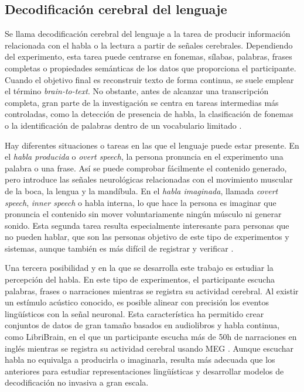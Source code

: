 \subsection{Decodificación cerebral del lenguaje}

Se llama decodificación cerebral del lenguaje a la tarea de producir información relacionada con el habla o la lectura a partir de señales cerebrales. Dependiendo del experimento, esta tarea puede centrarse en fonemas, sílabas, palabras, frases completas o propiedades semánticas de los datos que proporciona el participante. Cuando el objetivo final es reconstruir texto de forma continua, se suele emplear el término \textit{brain-to-text}. No obstante, antes de alcanzar una transcripción completa, gran parte de la investigación se centra en tareas intermedias más controladas, como la detección de presencia de habla, la clasificación de fonemas o la identificación de palabras dentro de un vocabulario limitado \cite{ozdogan2025libribrain,jayalath2025unlocking}.

Hay diferentes situaciones o tareas en las que el lenguaje puede estar presente. En el \textit{habla producida} o \textit{overt speech}, la persona pronuncia en el experimento una palabra o una frase. Así se puede comprobar fácilmente el contenido generado, pero introduce las señales neurológicas relacionadas con el movimiento muscular de la boca, la lengua y la mandíbula. En el \textit{habla imaginada}, llamada \textit{covert speech}, \textit{inner speech} o habla interna, lo que hace la persona es imaginar que pronuncia el contenido sin mover voluntariamente ningún músculo ni generar sonido. Esta segunda tarea resulta especialmente interesante para personas que no pueden hablar, que son las personas objetivo de este tipo de experimentos y sistemas, aunque también es más difícil de registrar y verificar \cite{panachakel2021covert,alzahrani2024systematic}.

Una tercera posibilidad y en la que se desarrolla este trabajo es estudiar la percepción del habla. En este tipo de experimentos, el participante escucha palabras, frases o narraciones mientras se registra su actividad cerebral. Al existir un estímulo acústico conocido, es posible alinear con precisión los eventos lingüísticos con la señal neuronal. Esta característica ha permitido crear conjuntos de datos de gran tamaño basados en audiolibros y habla continua, como LibriBrain, en el que un participante escucha más de 50h de narraciones en inglés mientras se registra su actividad cerebral usando MEG \cite{ozdogan2025libribrain}. Aunque escuchar habla no equivalga a producirla o imaginarla, resulta más adecuada que los anteriores para estudiar representaciones lingüísticas y desarrollar modelos de decodificación no invasiva a gran escala.


